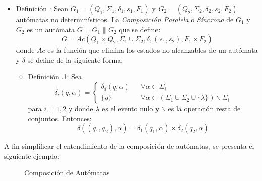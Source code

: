 \begin{itemize}
  \item \underline{Definición \thedefinitionsCounter}: Sean $G_{1} = (Q_{1}, \Sigma_{1},
  \delta_{1}, s_{1}, F_{1})$ y $G_{2} = (Q_{2}, \Sigma_{2}, \delta_{2}, s_{2},
  F_{2})$ autómatas no determinísticos. La \textit{Composición Paralela} o
  \textit{Síncrona} de $G_{1}$ y $G_{2}$ es un autómata $G = G_{1} \parallel
  G_{2}$ que se define:
  $$ G = Ac(Q_{1} \times Q_{2}, \Sigma_{1} \cup \Sigma_{2}, \delta, (s_{1},
  s_{2}), F_{1} \times F_{2}) $$ donde $Ac$ es la función que elimina los estados no
 alcanzables de un autómata y $ \delta $ se define de la siguiente forma:
 \begin{itemize}
  \item \underline{Definición \thedefinitionsCounter.1}: Sea
   $$ \bar{\delta_{i}}(q,\alpha) =
   \left\{ 
     \begin{array}{lll}
      \delta_{i}(q, \alpha) & & \forall \alpha \in \Sigma_{i} \\
      \{q\} & & \forall \alpha \in (\Sigma_{1} \cup \Sigma_{2} \cup \{\lambda\})
      \backslash \Sigma_{i}
     \end{array}
   \right. $$
   para $i = 1,2$ y donde $\lambda$ es el evento nulo y $\backslash$ es la
   operación resta de conjuntos.
   Entonces: $$ \delta((q_{1},
   q_{2}), \alpha) = \bar{\delta_{1}}(q_{1}, \alpha) \times \bar{\delta_{2}}(q_{2}, \alpha) $$
 \end{itemize}
\end{itemize}

A fin simplificar el entendimiento de la composición de autómatas, se presenta
el siguiente ejemplo:

\begin{figure}[h]
  \centering
  \caption{Composición de Autómatas}
  \label{fig:composicion_automatas}
\end{figure}

